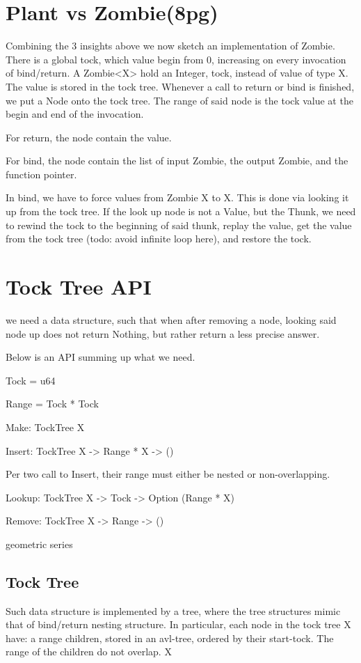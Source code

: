 \section{Plant vs Zombie(8pg)}
Combining the 3 insights above we now sketch an implementation of Zombie.
There is a global tock, which value begin from 0, increasing on every invocation of bind/return.
A Zombie<X> hold an Integer, tock, instead of value of type X.
The value is stored in the tock tree.
Whenever a call to return or bind is finished, we put a Node onto the tock tree.
The range of said node is the tock value at the begin and end of the invocation.

For return, the node contain the value.

For bind, the node contain the list of input Zombie, the output Zombie, and the function pointer.

In bind, we have to force values from Zombie X to X. This is done via looking it up from the tock tree. If the look up node is not a Value, but the Thunk, we need to rewind the tock to the beginning of said thunk, replay the value, get the value from the tock tree (todo: avoid infinite loop here), and restore the tock.

\section{Tock Tree API}
we need a data structure, such that when after removing a node, looking said node up does not return Nothing, but rather return a less precise answer.

Below is an API summing up what we need.

Tock = u64

Range = Tock * Tock

Make: TockTree X

Insert: TockTree X -> Range * X -> ()

Per two call to Insert, their range must either be nested or non-overlapping.

Lookup: TockTree X -> Tock -> Option (Range * X)

Remove: TockTree X -> Range -> ()

geometric series
\subsection{Tock Tree}
Such data structure is implemented by a tree, where the tree structures mimic that of bind/return nesting structure. In particular, each node in the tock tree X have:
a range
children, stored in an avl-tree, ordered by their start-tock. The range of the children do not overlap.
X

